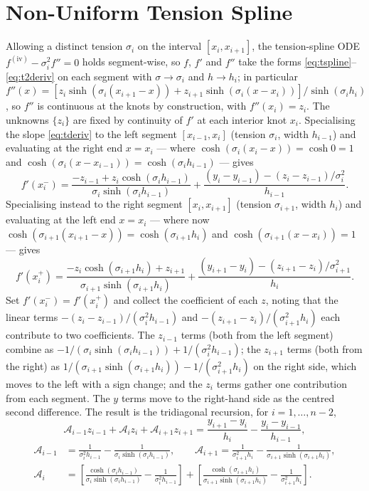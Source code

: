 \documentclass[10pt]{article}
\begin{document}
\section{Non-Uniform Tension Spline}\label{app:nonunif}
Allowing a distinct tension $\sigma_i$ on the interval $[x_i,x_{i+1}]$, the tension-spline ODE
$f^{(\mathrm{iv})}-\sigma_i^2 f''=0$ holds segment-wise, so $f$, $f'$ and $f''$ take the forms
\eqref{eq:tspline}--\eqref{eq:t2deriv} on each segment with $\sigma\!\to\!\sigma_i$ and
$h\!\to\!h_i$; in particular $f''(x)=[z_i\sinh(\sigma_i(x_{i+1}-x))+z_{i+1}\sinh(\sigma_i(x-x_i))]/\sinh(\sigma_i h_i)$,
so $f''$ is continuous at the knots by construction, with $f''(x_i)=z_i$. The unknowns
$\{z_i\}$ are fixed by continuity of $f'$ at each interior knot $x_i$. Specialising the slope
\eqref{eq:tderiv} to the left segment $[x_{i-1},x_i]$ (tension $\sigma_i$, width $h_{i-1}$) and
evaluating at the right end $x=x_i$ --- where $\cosh(\sigma_i(x_i-x))=\cosh 0=1$ and
$\cosh(\sigma_i(x-x_{i-1}))=\cosh(\sigma_i h_{i-1})$ --- gives
\[
f'(x_i^-)=\frac{-z_{i-1}+z_i\cosh(\sigma_i h_{i-1})}{\sigma_i\sinh(\sigma_i h_{i-1})}
+\frac{(y_i-y_{i-1})-(z_i-z_{i-1})/\sigma_i^2}{h_{i-1}} .
\]
Specialising instead to the right segment $[x_i,x_{i+1}]$ (tension $\sigma_{i+1}$, width $h_i$)
and evaluating at the left end $x=x_i$ --- where now $\cosh(\sigma_{i+1}(x_{i+1}-x))=\cosh(\sigma_{i+1}h_i)$
and $\cosh(\sigma_{i+1}(x-x_i))=1$ --- gives
\[
f'(x_i^+)=\frac{-z_i\cosh(\sigma_{i+1}h_i)+z_{i+1}}{\sigma_{i+1}\sinh(\sigma_{i+1}h_i)}
+\frac{(y_{i+1}-y_i)-(z_{i+1}-z_i)/\sigma_{i+1}^2}{h_i} .
\]
Set $f'(x_i^-)=f'(x_i^+)$ and collect the coefficient of each $z$, noting that the linear terms
$-(z_i-z_{i-1})/(\sigma_i^2 h_{i-1})$ and $-(z_{i+1}-z_i)/(\sigma_{i+1}^2 h_i)$ each contribute to
two coefficients. The $z_{i-1}$ terms (both from the left segment) combine as
$-1/(\sigma_i\sinh(\sigma_i h_{i-1}))+1/(\sigma_i^2 h_{i-1})$; the $z_{i+1}$ terms (both from the
right) as $1/(\sigma_{i+1}\sinh(\sigma_{i+1}h_i))-1/(\sigma_{i+1}^2 h_i)$ on the right side, which
moves to the left with a sign change; and the $z_i$ terms gather one contribution from each
segment. The $y$ terms move to the right-hand side as the centred second difference. The result
is the tridiagonal recursion, for $i=1,\dots,n-2$,
\begin{equation}
\mathcal{A}_{i-1}z_{i-1}+\mathcal{A}_i z_i+\mathcal{A}_{i+1}z_{i+1}
=\frac{y_{i+1}-y_i}{h_i}-\frac{y_i-y_{i-1}}{h_{i-1}},
\label{eq:nonunif}
\end{equation}
\begin{align}
\mathcal{A}_{i-1}&=\frac{1}{\sigma_i^2 h_{i-1}}-\frac{1}{\sigma_i\sinh(\sigma_i h_{i-1})},
\qquad
\mathcal{A}_{i+1}=\frac{1}{\sigma_{i+1}^2 h_i}-\frac{1}{\sigma_{i+1}\sinh(\sigma_{i+1}h_i)},\\
\mathcal{A}_i&=\left[\frac{\cosh(\sigma_i h_{i-1})}{\sigma_i\sinh(\sigma_i h_{i-1})}-\frac{1}{\sigma_i^2 h_{i-1}}\right]
+\left[\frac{\cosh(\sigma_{i+1}h_i)}{\sigma_{i+1}\sinh(\sigma_{i+1}h_i)}-\frac{1}{\sigma_{i+1}^2 h_i}\right].
\end{align}
\end{document}
